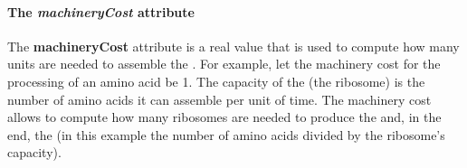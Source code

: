 \paragraph{The \textit{machineryCost} attribute}
The \textbf{machineryCost} attribute is a real value that is used to
compute how many \machinery{} units are needed to assemble the \component{}.
For example, let the machinery cost for the processing of an amino acid be 1.
The capacity of the \machinery{} (the ribosome) is the number of amino acids
it can assemble per unit of time.
The machinery cost allows to compute how many ribosomes are needed
to produce the \component{} and, in the end, the \macromolecule{}
(in this example the number of amino acids divided by the ribosome's capacity).
